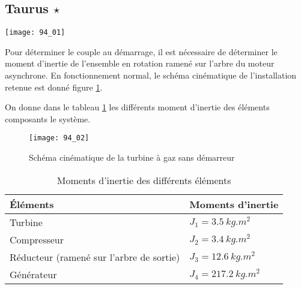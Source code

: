 \normaltrue \difficilefalse \tdifficilefalse
\correctionfalse


\subsection*{Taurus $\star$ \label{TEC:04:Jeq:94}}
\setcounter{question}{0}



\ifcorrection
\else
{}
\fi

\ifprof
\else

\begin{marginfigure}
\texttt{[image: 94\_01]}
\end{marginfigure}
Pour déterminer le couple au démarrage, il est nécessaire de déterminer le moment d’inertie de
 l’ensemble en rotation ramené sur l’arbre du moteur asynchrone.
 En fonctionnement normal, le schéma cinématique de l’installation retenue est donné figure \ref{fig_94_02}.
 


On donne dans le tableau \ref{tab_94_01} les différents moment d'inertie des éléments composants le système.


\begin{figure}[!h]
\texttt{[image: 94\_02]}
\caption{Schéma cinématique de la turbine à gaz sans démarreur \label{fig_94_02}}
\end{figure}

\begin{table}[!h]
\begin{tabular}{ll}
\hline
Éléments & Moments d’inertie \\ \hline
 Turbine 	& $J_1= \SI{3,5}{kg.m^2}$ \\
 Compresseur 	& $J_2=\SI{3,4}{kg.m^2}$\\
 Réducteur (ramené sur l’arbre de sortie)&  $J_3=\SI{12,6}{kg.m^2}$\\
 Générateur 	& $J_4=\SI{217,2}{kg.m^2}$\\
 \hline
\end{tabular}
\caption{Moments d’inertie des différents éléments \label{tab_94_01}}
 \end{table}

